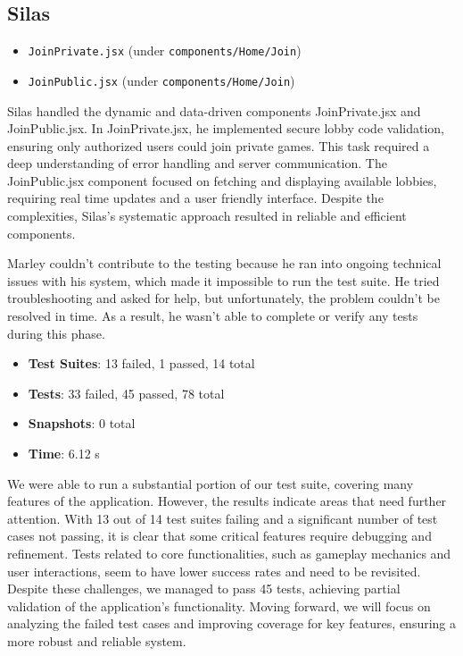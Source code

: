 \documentclass[12pt]{article}
\begin{document}
\subsection*{Silas}
\begin{itemize}
    \item \texttt{JoinPrivate.jsx} (under \texttt{components/Home/Join})
    \item \texttt{JoinPublic.jsx} (under \texttt{components/Home/Join})
\end{itemize}

\noindent Silas handled the dynamic and data-driven components JoinPrivate.jsx and JoinPublic.jsx. In JoinPrivate.jsx, he implemented secure lobby code validation, ensuring only authorized users could join private games. This task required a deep understanding of error handling and server communication. The JoinPublic.jsx component focused on fetching and displaying available lobbies, requiring real time updates and a user friendly interface. Despite the complexities, Silas’s systematic approach resulted in reliable and efficient components.

\noindent Marley couldn’t contribute to the testing because he ran into ongoing technical issues with his system, which made it impossible to run the test suite. He tried troubleshooting and asked for help, but unfortunately, the problem couldn’t be resolved in time. As a result, he wasn’t able to complete or verify any tests during this phase.


\begin{itemize}
    \item \textbf{Test Suites}: 13 failed, 1 passed, 14 total
    \item \textbf{Tests}: 33 failed, 45 passed, 78 total
    \item \textbf{Snapshots}: 0 total
    \item \textbf{Time}: 6.12 s
\end{itemize}

\noindent We were able to run a substantial portion of our test suite, covering many features of the application. However, the results indicate areas that need further attention. With 13 out of 14 test suites failing and a significant number of test cases not passing, it is clear that some critical features require debugging and refinement. Tests related to core functionalities, such as gameplay mechanics and user interactions, seem to have lower success rates and need to be revisited. Despite these challenges, we managed to pass 45 tests, achieving partial validation of the application’s functionality. Moving forward, we will focus on analyzing the failed test cases and improving coverage for key features, ensuring a more robust and reliable system.
\end{document}
